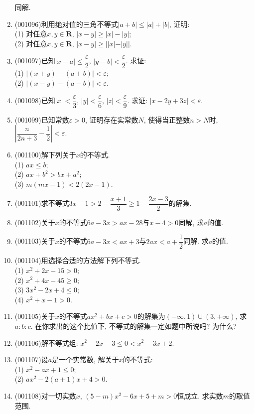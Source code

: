 \documentclass[10pt,a4paper]{article}
\begin{document}
\begin{enumerate}[1.]
同解.
\item {\tiny (001096)}利用绝对值的三角不等式$|a+b|\le |a|+|b|$, 证明:\\ 
(1) 对任意$x,y\in\mathbf{R}$, $|x-y|\ge |x|-|y|$;\\ 
(2) 对任意$x,y\in\mathbf{R}$, $|x-y|\ge ||x|-|y||$.
\item {\tiny (001097)}已知$|x-a|\le \dfrac{\varepsilon}{2}$, $|y-b|<\dfrac{\varepsilon}{2}$. 求证:\\ 
(1) $|(x+y)-(a+b)|<\varepsilon$;\\ 
(2) $|(x-y)-(a-b)|<\varepsilon$.
\item {\tiny (001098)}已知$|x|<\dfrac{\varepsilon}{3}$, $|y|<\dfrac{\varepsilon}{6}$, $|z|<\dfrac{\varepsilon}{9}$. 求证: $|x-2y+3z|<\varepsilon$.
\item {\tiny (001099)}已知常数$\varepsilon>0$, 证明存在实常数$N$, 使得当正整数$n>N$时, $\left|\dfrac{n}{2n+3}-\dfrac{1}{2}\right|<\varepsilon$.
\item {\tiny (001100)}解下列关于$x$的不等式.\\ 
(1) $ax\le b$;\\ 
(2) $ax+b^2>bx+a^2$;\\ 
(3) $m(mx-1)<2(2x-1)$.
\item {\tiny (001101)}求不等式$3x-1>2-\dfrac{x+1}{3}\ge 1-\dfrac{2x-3}{2}$的解集.
\item {\tiny (001102)}关于$x$的不等式$6a-3x>ax-28$与$x-4>0$同解, 求$a$的值.
\item {\tiny (001103)}关于$x$的不等式$6a-3x<ax+3$与$2ax<a+\dfrac{1}{2}$同解. 求$a$的值.
\item {\tiny (001104)}用选择合适的方法解下列不等式.\\ 
(1) $x^2+2x-15>0$;\\ 
(2) $x^2+4x-45\ge 0$;\\ 
(3) $3x^2-2x+4\le0$;\\ 
(4) $x^2+x-1>0$.
\item {\tiny (001105)}关于$x$的不等式$ax^2+bx+c>0$的解集为$(-\infty,1)\cup (3,+\infty)$, 求$a:b:c$. 在你求出的这个比值下, 不等式的解集一定如题中所说吗? 为什么?
\item {\tiny (001106)}解不等式组: $x^2-2x-3\le 0<x^2-3x+2$.
\item {\tiny (001107)}设$a$是一个实常数, 解关于$x$的不等式:\\ 
(1) $x^2-ax+1\le 0$;\\ 
(2) $ax^2-2(a+1)x+4>0$.
\item {\tiny (001108)}对一切实数$x$, $(5-m)x^2-6x+5+m>0$恒成立. 求实数$m$的取值范围.

\end{enumerate}
\end{document}
